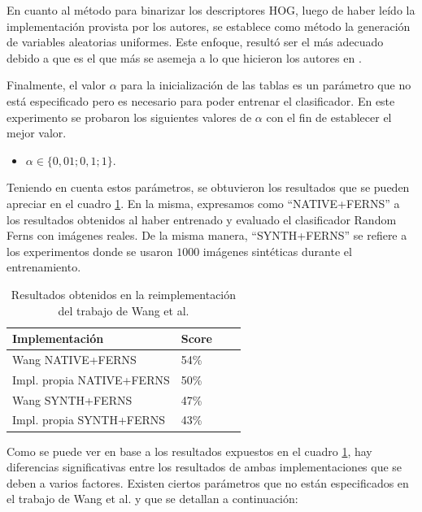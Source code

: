 	En cuanto al método para binarizar los descriptores HOG, luego de haber leído la implementación provista por los autores, se establece como método la generación de variables aleatorias uniformes. Este enfoque, resultó ser el más adecuado debido a que es el que más se asemeja a lo que hicieron los autores en \cite{wang}	.
	
	Finalmente, el valor $\alpha$ para la inicialización de las tablas es un parámetro que no está especificado pero es necesario para poder entrenar el clasificador. En este experimento se probaron los siguientes valores de $\alpha$ con el fin de establecer el mejor valor.
	
	\begin{itemize}
		\item $\alpha \in \{0,01; 0,1; 1\}$.
	\end{itemize}
	
	Teniendo en cuenta estos parámetros, se obtuvieron los resultados que se pueden apreciar en el cuadro \ref{table: Baseline-Table}. En la misma, expresamos como ``NATIVE+FERNS'' a los resultados obtenidos al haber entrenado y evaluado el clasificador Random Ferns con imágenes reales. De la misma ma\-ne\-ra, ``SYNTH+FERNS'' se  refiere a los experimentos donde se usaron $1000$ imágenes sintéticas durante el entrenamiento.

	\begin{table}
		\centering
	    \begin{tabular}{ | l | l | l | p{5cm} |}
    			\hline
    				\textbf{Implementación} & \textbf{Score} \\ \hline
    				Wang NATIVE+FERNS & 54\% \\ \hline
    				Impl. propia NATIVE+FERNS & 50\% \\ \hline
    				Wang SYNTH+FERNS & 47\% \\ \hline
    				Impl. propia SYNTH+FERNS & 43\% \\

    			\hline
    		\end{tabular}
    		\caption[Resultados reales y sintéticas para baseline]{Resultados obtenidos en la reimplementación del trabajo de Wang et al.}
    		\label{table: Baseline-Table}
	\end{table}

	Como se puede ver en base a los resultados expuestos en el cuadro \ref{table: Baseline-Table}, hay diferencias significativas entre los resultados de ambas implementaciones que se deben a varios factores. Existen ciertos parámetros que no están especificados en el trabajo de Wang et al. y que se detallan a continuación:
	
